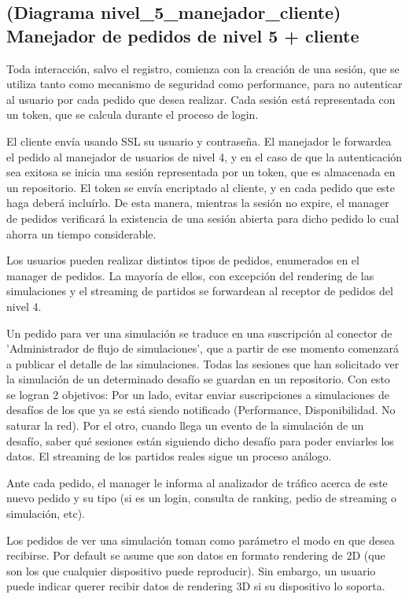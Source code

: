 \subsection{(Diagrama nivel_5_manejador_cliente) Manejador de pedidos de nivel 5 + cliente}


Toda interacción, salvo el registro, comienza con la creación de una sesión, que se utiliza tanto como mecanismo de seguridad como performance, para no autenticar al usuario por cada pedido que desea realizar.
Cada sesión está representada con un token, que se calcula durante el proceso de login.

El cliente envía usando SSL su usuario y contraseña. El manejador le forwardea el pedido al manejador de usuarios de nivel 4, y en el caso de que la autenticación sea exitosa se inicia una sesión representada por un token, que es almacenada en un repositorio. El token se envía encriptado al cliente, y en cada pedido que este haga deberá incluírlo. De esta manera, mientras la sesión no expire, el manager de pedidos verificará la existencia de una sesión abierta para dicho pedido lo cual ahorra un tiempo considerable.

Los usuarios pueden realizar distintos tipos de pedidos, enumerados en el manager de pedidos. La mayoría de ellos, con excepción del rendering de las simulaciones y el streaming de partidos se forwardean al receptor de pedidos del nivel 4.

Un pedido para ver una simulación se traduce en una suscripción al conector de 'Administrador de flujo de simulaciones', que a partir de ese momento comenzará a publicar el detalle de las simulaciones. Todas las sesiones que han solicitado ver la simulación de un determinado desafío se guardan en un repositorio. Con esto se logran 2 objetivos: Por un lado, evitar enviar suscripciones a simulaciones de desafíos de los que ya se está siendo notificado (Performance, Disponibilidad. No saturar la red). Por el otro, cuando llega un evento de la simulación de un desafío, saber qué sesiones están siguiendo dicho desafío para poder enviarles los datos.
El streaming de los partidos reales sigue un proceso análogo.

Ante cada pedido, el manager le informa al analizador de tráfico acerca de este nuevo pedido y su tipo (si es un login, consulta de ranking, pedio de streaming o simulación, etc).

Los pedidos de ver una simulación toman como parámetro el modo en que desea recibirse. Por default se asume que son datos en formato rendering de 2D (que son los que cualquier dispositivo puede reproducir). Sin embargo, un usuario puede indicar querer recibir datos de rendering 3D si su dispositivo lo soporta.

